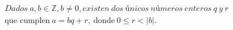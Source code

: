 \documentclass[preview]{standalone}
\begin{document}
\begin{align*}
Dados\ a, b \in \mathbb{Z}, b \neq 0, existen\ dos\ únicos\ números\ enteros\ q\ y\ r\\ \text{que\ cumplen} \ a = bq + r,\ \text{donde}\ 0 \leq r < |b|.
\end{align*}
\end{document}
